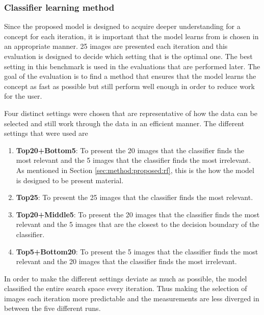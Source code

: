 \subsubsection{Classifier learning method}
\label{sec:method:eval:param:learning}
Since the proposed model is designed to acquire deeper understanding for a concept for each iteration, it is important that the model learns from is chosen in an appropriate manner. 25 images are presented each iteration and this evaluation is designed to decide which setting that is the optimal one. The best setting in this benchmark is used in the evaluations that are performed later. 
The goal of the evaluation is to find a method that ensures that the model learns the concept as fast as possible but still perform well enough in order to reduce work for the user. 

Four distinct settings were chosen that are representative of how the data can be selected and still work through the data in an efficient manner. The different settings that were used are
\begin{enumerate}
	\item \textbf{Top20+Bottom5}: To present the 20 images that the classifier finds the most relevant and the 5 images that the classifier finds the most irrelevant. As mentioned in Section \ref{sec:method:proposed:rf}, this is the how the model is designed to be present material.  
	\item \textbf{Top25}: To present the 25 images that the classifier finds the most relevant. 
	\item \textbf{Top20+Middle5}: To present the 20 images that the classifier finds the most relevant and the 5 images that are the closest to the decision boundary of the classifier. 
	\item \textbf{Top5+Bottom20}: To present the 5 images that the classifier finds the most relevant and the 20 images that the classifier finds the most irrelevant. 
\end{enumerate}
In order to make the different settings deviate as much as possible, the model classified the entire search space every iteration. Thus making the selection of images each iteration more predictable and the measurements are less diverged in between the five different runs.

